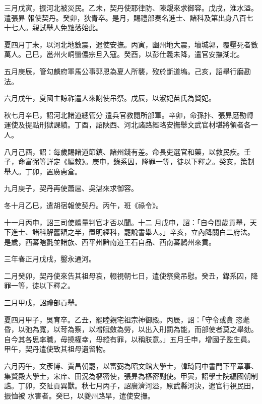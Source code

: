 \begin{pinyinscope}
 三月戊寅，振河北被災民。乙未，契丹使耶律防、陳覬來求御容。戊戌，淮水溢。遣張昪
 報使契丹。癸卯，狄青卒。是月，賜禮部奏名進士、諸科及第出身八百七十七人。親試舉人免黜落始此。



 夏四月丁未，以河北地數震，遣使安撫。丙寅，幽州地大震，壞城郭，覆壓死者數萬人。己巳，邕州火峒蠻儂宗旦入寇。癸酉，以彭仕羲未降，遣官安撫湖北。



 五月庚辰，管勾麟府軍馬公事郭恩為夏人所襲，歿於斷道塢。己亥，詔舉行磨勘法。



 六月戊午，夏國主諒祚遣人來謝使吊祭。戊辰，以淑妃苗氏為賢妃。



 秋七月辛巳，詔河北諸道總管分
 遣兵官教閱所部軍。辛卯，命孫抃、張昪磨勘轉運使及提點刑獄課績。丁酉，詔陜西、河北諸路經略安撫舉文武官材堪將領者各一人。



 八月己酉，詔：每歲賜諸道節鎮、諸州錢有差。命長吏選官和藥，以救民疾。壬子，命富弼等詳定《編敕》。庚申，錄系囚，降罪一等，徒以下釋之。癸亥，策制舉人。丁卯，置廣惠倉。



 九月庚子，契丹再使蕭扈、吳湛來求御容。



 冬十月乙巳，遣胡宿報使契丹。丙午，班《祿令》。



 十一月丙申，詔三司使體量判官才否以聞。十二
 月戊申，詔：「自今間歲貢舉，天下進士、諸科解舊額之半，置明經科，罷說書舉人。」辛亥，立內降關白二府法。是歲，西蕃瞎氈並諸族、西平州黔南道王石自品、西南蕃鶼州來貢。



 三年春正月戊戌，鑿永通河。



 二月癸卯，契丹使來告其祖母哀，輟視朝七日，遣使祭奠吊慰。癸丑，錄系囚，降罪一等，徒以下釋之。



 三月甲戌，詔禮部貢舉。



 夏四月甲子，吳育卒。乙丑，罷睦親宅祖宗神御殿。丙辰，詔：「守令或貪
 恣耄昏，以弛為寬，以苛為察，以增賦斂為勞，以出入刑罰為能，而部使者莫之舉劾。自今其各思率職，毋撓權幸，毋縱有罪，以稱朕意。」五月壬申，增國子監生員。甲午，契丹遣使致其祖母遺留物。



 六月丙午，文彥博、賈昌朝罷，以富弼為昭文館大學士，韓琦同中書門下平章事、集賢殿大學士，宋庠、田況為樞密使，張昪為樞密副使。甲寅，詔學士院編國朝制誥。丁卯，交阯貢異獸。秋七月丙子，詔廣濟河溢，原武縣河決，遣官行視民田，振恤被
 水害者。癸巳，以夔州路旱，遣使安撫。




\end{pinyinscope}
